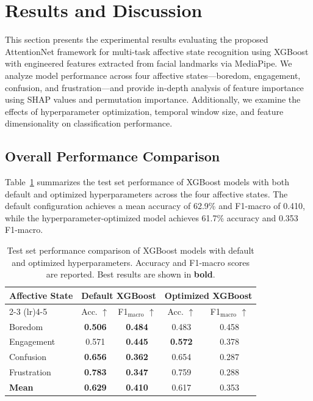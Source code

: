 \section{Results and Discussion}
\label{sec:results}

This section presents the experimental results evaluating the proposed AttentionNet framework for multi-task affective state recognition using XGBoost with engineered features extracted from facial landmarks via MediaPipe. We analyze model performance across four affective states---boredom, engagement, confusion, and frustration---and provide in-depth analysis of feature importance using SHAP values and permutation importance. Additionally, we examine the effects of hyperparameter optimization, temporal window size, and feature dimensionality on classification performance.

\subsection{Overall Performance Comparison}
\label{sec:overall-performance}

Table~\ref{tab:model-comparison} summarizes the test set performance of XGBoost models with both default and optimized hyperparameters across the four affective states. The default configuration achieves a mean accuracy of 62.9\% and F1-macro of 0.410, while the hyperparameter-optimized model achieves 61.7\% accuracy and 0.353 F1-macro.

\begin{table}[t]
\centering
\caption{Test set performance comparison of XGBoost models with default and optimized hyperparameters. Accuracy and F1-macro scores are reported. Best results are shown in \textbf{bold}.}
\label{tab:model-comparison}
\begin{tabular}{lcccc}
\toprule
\multirow{2}{*}{\textbf{Affective State}} & \multicolumn{2}{c}{\textbf{Default XGBoost}} & \multicolumn{2}{c}{\textbf{Optimized XGBoost}} \\
\cmidrule(lr){2-3} \cmidrule(lr){4-5}
& Acc. $\uparrow$ & F1$_{\text{macro}}$ $\uparrow$ & Acc. $\uparrow$ & F1$_{\text{macro}}$ $\uparrow$ \\
\midrule
Boredom & \textbf{0.506} & \textbf{0.484} & 0.483 & 0.458 \\
Engagement & 0.571 & \textbf{0.445} & \textbf{0.572} & 0.378 \\
Confusion & \textbf{0.656} & \textbf{0.362} & 0.654 & 0.287 \\
Frustration & \textbf{0.783} & \textbf{0.347} & 0.759 & 0.288 \\
\midrule
\textbf{Mean} & \textbf{0.629} & \textbf{0.410} & 0.617 & 0.353 \\
\bottomrule
\end{tabular}
\end{table}

